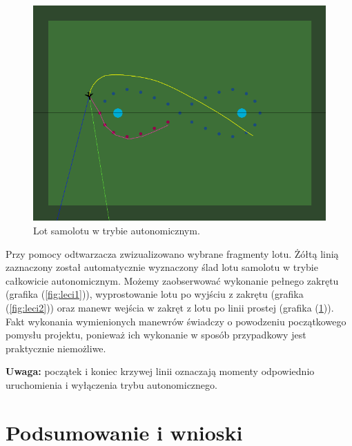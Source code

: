 \documentclass[12pt, a4paper]{article}
\let\oldref\ref
\renewcommand{\ref}[1]{(\oldref{#1})}
\begin{document}
 \begin{figure}[H]
    \centering
    \includegraphics[width=1\textwidth]{aileci3}
    \caption{Lot samolotu w trybie autonomicznym.}
    \label{fig:leci3}
\end{figure}

Przy pomocy odtwarzacza zwizualizowano wybrane fragmenty lotu. Żółtą linią zaznaczony został automatycznie wyznaczony ślad lotu samolotu w trybie całkowicie autonomicznym. Możemy zaobserwować wykonanie pełnego zakrętu (grafika \ref{fig:leci1}), wyprostowanie lotu po wyjściu z zakrętu (grafika \ref{fig:leci2}) oraz manewr wejścia w zakręt z lotu po linii prostej (grafika \ref{fig:leci3}). Fakt wykonania wymienionych manewrów świadczy o powodzeniu początkowego pomysłu projektu, ponieważ ich wykonanie w sposób przypadkowy jest praktycznie niemożliwe.

\textbf{Uwaga:} początek i koniec krzywej linii oznaczają momenty odpowiednio uruchomienia i wyłączenia trybu autonomicznego. 


\FloatBarrier
\clearpage
\section{Podsumowanie i wnioski}
\end{document}
